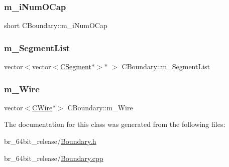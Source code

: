 \subsubsection{\texorpdfstring{m\_iNumOCap}{m\_iNumOCap}}
{\footnotesize\ttfamily short C\+Boundary\+::m\+\_\+i\+Num\+O\+Cap}

\mbox{\label{classCBoundary_af055739711c239aa34367a294ba6dab3}} 
\subsubsection{\texorpdfstring{m\_SegmentList}{m\_SegmentList}}
{\footnotesize\ttfamily vector$<$vector$<$\mbox{\hyperlink{classCSegment}{C\+Segment}}$\ast$$>$$\ast$ $>$ C\+Boundary\+::m\+\_\+\+Segment\+List\hspace{0.3cm}{\ttfamily [protected]}}

\mbox{\label{classCBoundary_a2912241d7c318a7733b1efcc82c7cb3a}} 
\subsubsection{\texorpdfstring{m\_Wire}{m\_Wire}}
{\footnotesize\ttfamily vector$<$\mbox{\hyperlink{classCWire}{C\+Wire}}$\ast$$>$ C\+Boundary\+::m\+\_\+\+Wire\hspace{0.3cm}{\ttfamily [protected]}}



The documentation for this class was generated from the following files\+:\begin{DoxyCompactItemize}
\item 
br\+\_\+64bit\+\_\+release/\mbox{\hyperlink{Boundary_8h}{Boundary.\+h}}\item 
br\+\_\+64bit\+\_\+release/\mbox{\hyperlink{Boundary_8cpp}{Boundary.\+cpp}}\end{DoxyCompactItemize}
